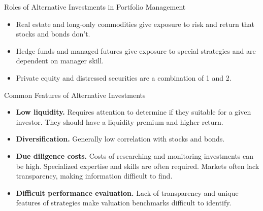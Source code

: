 \documentclass[../custom]{flashcards}
\begin{document}

\begin{flashcard}{Roles of Alternative Investments in Portfolio Management}
    \begin{itemize}
        \item Real estate and long-only commodities give exposure to risk and return that stocks and bonds don't.
        \item Hedge funds and managed futures give exposure to special strategies and are dependent on manager skill.
        \item Private equity and distressed securities are a combination of 1 and 2.
    \end{itemize}
\end{flashcard}

\begin{flashcard}{Common Features of Alternative Investments}
    \begin{itemize}
        \item \textbf{Low liquidity.} Requires attention to determine if they suitable for a given investor. They should have a liquidity premium and higher return.
        \item \textbf{Diversification.} Generally low correlation with stocks and bonds.
        \item \textbf{Due diligence costs.} Costs of researching and monitoring investments can be high. Specialized expertise and skills are often required. Markets often lack transparency, making information difficult to find.
        \item \textbf{Difficult performance evaluation.} Lack of transparency and unique features of strategies make valuation benchmarks difficult to identify.
    \end{itemize}
\end{flashcard}
\end{document}
